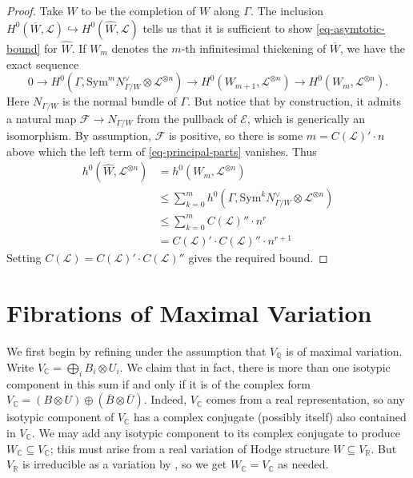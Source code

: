 \documentclass[12pt]{amsart}
\newcommand{\R}{\mathbb{R}}
\newcommand{\Q}{\mathbb{Q}}
\newcommand{\C}{\mathbb{C}}
\theoremstyle{definition}
\theoremstyle{remark}
\numberwithin{equation}{section}
\begin{document}
\begin{proof}
Take \(\widehat{W}\) to be the completion of \(W\) along \(\Gamma\).
The inclusion \(H^0(\overline{W}, \mathcal{L}) \hookrightarrow 
H^0(\widehat{W}, \mathcal{L})\) tells us that it is sufficient to show
\eqref{eq-asymtotic-bound} for \(\widehat{W}\). If \(W_m\) denotes the \(m\)-th
infinitesimal thickening of \(\overline{W}\), we have the exact sequence
\begin{equation} \label{eq-principal-parts}
    0 \to H^0(\Gamma, \text{Sym}^m N_{\Gamma / W}^\vee 
        \otimes \mathcal{L}^{\otimes n}) \to 
    H^0(W_{m+1}, \mathcal{L}^{\otimes n}) \to 
    H^0(W_{m}, \mathcal{L}^{\otimes n}).
\end{equation}
Here \(N_{\Gamma / W}\) is the normal bundle of \(\Gamma\). But notice that 
by construction, it admits a natural map \(\mathcal{F} \to N_{\Gamma / W}\)
from the pullback of \(\mathcal{E}\), which is generically an isomorphism.
By assumption, \(\mathcal{F}\) is positive, so there is some
\(m = C(\mathcal{L})' \cdot n\) above which the left term of
\eqref{eq-principal-parts} vanishes. Thus
\begin{align*}
    h^0(\widehat{W}, \mathcal{L}^{\otimes n}) 
    &= h^0(W_m, \mathcal{L}^{\otimes n}) \\
    &\leq \sum_{k=0}^m h^0(\Gamma, \text{Sym}^k N_{\Gamma / W}^\vee 
        \otimes \mathcal{L}^{\otimes n}) \\
    &\leq \sum_{k=0}^m C(\mathcal{L})'' \cdot n^r \\
    &= C(\mathcal{L})' \cdot C(\mathcal{L})'' \cdot n^{r+1}
\end{align*}
Setting \(C(\mathcal{L}) = C(\mathcal{L})' \cdot C(\mathcal{L})''\) gives the
required bound.
\end{proof}


\section{Fibrations of Maximal Variation}

We first begin by refining  under the assumption
that $V_\Q$ is of maximal variation. Write $V_\C = \bigoplus_i B_i \otimes U_i$.
We claim that in fact, there is more than one isotypic component in this sum if and
only if it is of the complex form
$V_\C = (B \otimes U) \oplus (\overline{B} \otimes \overline{U})$. 
Indeed, \(V_\C\) comes from a real representation, so any isotypic component
of \(V_\C\) has a complex conjugate (possibly itself) also contained in \(V_\C\).
We may add any isotypic component to its complex conjugate to produce
$W_\C \subseteq V_\C$; this must arise from a real variation of Hodge structure
\(W \subseteq V_\R\). But \(V_\R\) is irreducible as a variation by 
, so we get $W_\C = V_\C$ as needed.
\end{document}
